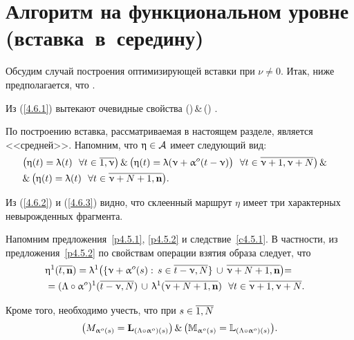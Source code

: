 
\section{
  Алгоритм на функциональном уровне 
  (вставка~в~середину)
}
\label{sect:4.6}
\setcounter{equation}{0}

Обсудим случай построения оптимизирующей вставки при
$\nu \neq 0$.
Итак, ниже предполагается, что
\bfn
  \label{4.6.1}
  \nu\in {}
  .
\efn

Из (\ref{4.6.1}) вытекают очевидные свойства
\bfn
  \label{4.6.2}
  (\neq \emp)\,\&\,(\neq \emp)
  .
\efn

По построению вставка, рассматриваемая в настоящем разделе, является <<средней>>.
Напомним, что $\upeta\in {\cal A}$ имеет следующий вид:
\begin{eqnarray}
  &\bigl(\eta(t) = \la(t)\ \ \fa t\in \ov{1,\nu}\bigl)\,\&\,\bigl(\eta(t) =
  \la(\nu+ \al^o(t-\nu)\bigl)\ \ \fa t\in \ov{\nu+1,\nu+N}\bigl)\,\&
  &\nonumber\\
  &\&\,\bigl(\eta(t)= \la(t)\ \ \fa t\in \ov{\nu+N+1,\mathbf{n}}\bigl)
  .
  &
  \label{4.6.3}
\end{eqnarray}

Из (\ref{4.6.2}) и (\ref{4.6.3}) видно,
что склеенный маршрут $\eta$
имеет три характерных невырожденных фрагмента.

Напомним предложения~\ref{p4.5.1}, \ref{p4.5.2} и следствие~\ref{c4.5.1}.
В частности,
из предложения~\ref{p4.5.2}
по свойствам операции взятия образа следует, что
\begin{eqnarray}
  &\eta^1(\ov{t,\mathbf{n}}) = \la^1\bigl(\{\nu+\al^o(s):\,s\in \ov{t-\nu,N}\}\,\cup\,
  \ov{\nu+N+1,\nn}\bigl) =
  &\nonumber\\
  &= (\La \circ\al^o)^1(\ov{t-\nu,N})\,\cup\, \la^1(\ov{\nu+N+1,\nn})\ \ \fa t\in \ov{\nu+1,\nu+N}
  .
  &
  \label{4.6.3`}
\end{eqnarray}

Кроме того,
необходимо учесть,
что при
$s\in \ov{1,N}$
$$
  \bigl(M_{\upalpha^o(s)} = \mathbf{L}_{(\Lambda\circ \upalpha^o)(s)}\bigl)\,\&\,\bigl({\mathbb M}_{\upalpha^o(s)} =
  {\mathbb L}_{(\Lambda\circ \upalpha^o)(s)}\bigl)
  .
$$

